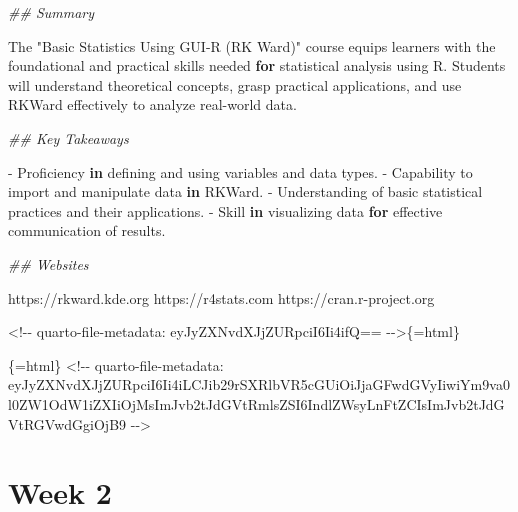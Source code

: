 \documentclass[
  letterpaper,
  DIV=11,
  numbers=noendperiod]{scrreprt}
\newenvironment{Shaded}{\begin{snugshade}}{\end{snugshade}}
\newcommand{\AttributeTok}[1]{\textcolor[rgb]{0.40,0.45,0.13}{#1}}
\newcommand{\ControlFlowTok}[1]{\textcolor[rgb]{0.00,0.23,0.31}{\textbf{#1}}}
\newcommand{\DocumentationTok}[1]{\textcolor[rgb]{0.37,0.37,0.37}{\textit{#1}}}
\newcommand{\ErrorTok}[1]{\textcolor[rgb]{0.68,0.00,0.00}{#1}}
\newcommand{\NormalTok}[1]{\textcolor[rgb]{0.00,0.23,0.31}{#1}}
\newcommand{\OtherTok}[1]{\textcolor[rgb]{0.00,0.23,0.31}{#1}}
\newcommand{\SpecialCharTok}[1]{\textcolor[rgb]{0.37,0.37,0.37}{#1}}
\newcommand{\StringTok}[1]{\textcolor[rgb]{0.13,0.47,0.30}{#1}}
\begin{document}
\begin{Shaded}
\begin{Highlighting}[]
\DocumentationTok{\#\# Summary}

\NormalTok{The }\StringTok{"Basic Statistics Using GUI{-}R (RK Ward)"}\NormalTok{ course equips learners with the foundational and practical skills needed }\ControlFlowTok{for}\NormalTok{ statistical analysis using R. Students will understand theoretical concepts, grasp practical applications, and use RKWard effectively to analyze real}\SpecialCharTok{{-}}\NormalTok{world data.}

\DocumentationTok{\#\# Key Takeaways}

\SpecialCharTok{{-}}\NormalTok{ Proficiency }\ControlFlowTok{in}\NormalTok{ defining and using variables and data types.}
\SpecialCharTok{{-}}\NormalTok{ Capability to import and manipulate data }\ControlFlowTok{in}\NormalTok{ RKWard.}
\SpecialCharTok{{-}}\NormalTok{ Understanding of basic statistical practices and their applications.}
\SpecialCharTok{{-}}\NormalTok{ Skill }\ControlFlowTok{in}\NormalTok{ visualizing data }\ControlFlowTok{for}\NormalTok{ effective communication of results.}

\DocumentationTok{\#\# Websites}

\NormalTok{https}\SpecialCharTok{:}\ErrorTok{//}\NormalTok{rkward.kde.org}
\NormalTok{https}\SpecialCharTok{:}\ErrorTok{//}\NormalTok{r4stats.com}
\NormalTok{https}\SpecialCharTok{:}\ErrorTok{//}\NormalTok{cran.r}\SpecialCharTok{{-}}\NormalTok{project.org}







\StringTok{\textasciigrave{}}\AttributeTok{\textless{}!{-}{-} quarto{-}file{-}metadata: eyJyZXNvdXJjZURpciI6Ii4ifQ== {-}{-}\textgreater{}}\StringTok{\textasciigrave{}}\NormalTok{\{}\OtherTok{=}\NormalTok{html\}}

\StringTok{\textasciigrave{}\textasciigrave{}\textasciigrave{}}\AttributeTok{\{=html\}}
\AttributeTok{\textless{}!{-}{-} quarto{-}file{-}metadata: eyJyZXNvdXJjZURpciI6Ii4iLCJib29rSXRlbVR5cGUiOiJjaGFwdGVyIiwiYm9va0l0ZW1OdW1iZXIiOjMsImJvb2tJdGVtRmlsZSI6IndlZWsyLnFtZCIsImJvb2tJdGVtRGVwdGgiOjB9 {-}{-}\textgreater{}}
\end{Highlighting}
\end{Shaded}


\chapter{Week 2}\label{week-2}
\end{document}
